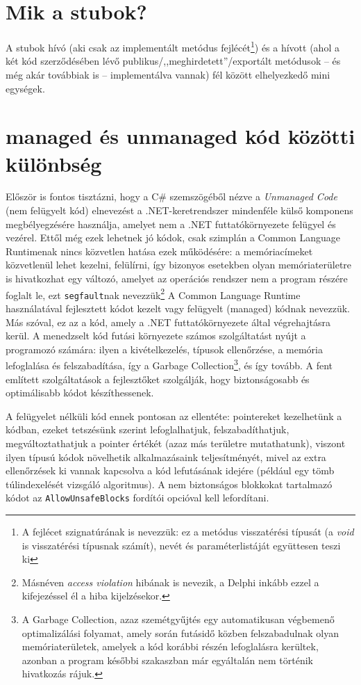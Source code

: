 \documentclass[tocnopagenum]{thesis-ekf}
\theoremstyle{definition}
\theoremstyle{remark}
\begin{document}
	\section{Mik a stubok?}
	A stubok hívó (aki csak az implementált metódus fejlécét\footnote{A fejlécet szignatúrának is nevezzük: ez a metódus visszatérési típusát (a \emph{void} is visszatérési típusnak számít), nevét és paraméterlistáját együttesen teszi ki}) és a hívott (ahol a két kód szerződésében lévő publikus/,,meghirdetett''/exportált metódusok -- és még akár továbbiak is -- implementálva vannak) fél között elhelyezkedő mini egységek.
	\section{managed és unmanaged kód közötti különbség}
	Először is fontos tisztázni, hogy a C\# szemszögéből nézve a \textit{Unmanaged Code} (nem felügyelt kód) elnevezést a .NET-keretrendszer mindenféle külső komponens megbélyegzésére használja, amelyet nem a .NET futtatókörnyezete felügyel és vezérel. Ettől még ezek lehetnek jó kódok, csak szimplán a Common Language Runtimenak nincs közvetlen hatása ezek működésére: a memóriacímeket közvetlenül lehet kezelni, felülírni, így bizonyos esetekben olyan memóriaterületre is hivatkozhat egy változó, amelyet az operációs rendszer nem a program részére foglalt le, ezt \verb*|segfault|nak nevezzük\footnote{Másnéven \textit{access violation} hibának is nevezik, a Delphi inkább ezzel a kifejezéssel él a hiba kijelzésekor.}
	\cite{managed} 
	A Common Language Runtime használatával fejlesztett kódot kezelt vagy felügyelt (managed) kódnak nevezzük. Más szóval, ez az a kód, amely a .NET futtatókörnyezete által végrehajtásra kerül. 
	A menedzselt kód futási környezete számos szolgáltatást nyújt a programozó számára: ilyen a kivételkezelés, típusok ellenőrzése, a memória lefoglalása és felszabadítása, így a Garbage Collection\footnote{A Garbage Collection, azaz szemétgyűjtés egy automatikusan végbemenő optimalizálási folyamat, amely során futásidő közben felszabadulnak olyan memóriaterületek, amelyek a kód korábbi részén lefoglalásra kerültek, azonban a program későbbi szakaszban már egyáltalán nem történik hivatkozás rájuk.}, és így tovább. A fent említett szolgáltatások a fejlesztőket szolgálják, hogy biztonságosabb és optimálisabb kódot készíthessenek.

	A felügyelet nélküli kód ennek pontosan az ellentéte: pointereket kezelhetünk a kódban, ezeket tetszésünk szerint lefoglalhatjuk, felszabadíthatjuk, megváltoztathatjuk a pointer értékét (azaz más területre mutathatunk), viszont ilyen típusú kódok növelhetik alkalmazásaink teljesítményét, mivel az extra ellenőrzések ki vannak kapcsolva a kód lefutásának idejére (például egy tömb túlindexelését vizsgáló algoritmus).
	A nem biztonságos blokkokat tartalmazó kódot az \verb*|AllowUnsafeBlocks| fordítói opcióval kell lefordítani.
	
\end{document}
